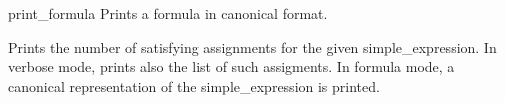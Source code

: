 \begin{nusmvCommand} {print\_formula} {Prints a formula in canonical format.}


Prints the number of satisfying assignments for the given simple\_expression. In
verbose mode, prints also the list of such assigments. In formula
mode, a canonical representation of the simple\_expression is printed.

\begin{cmdOpt}
\end{cmdOpt}



\end{nusmvCommand}
